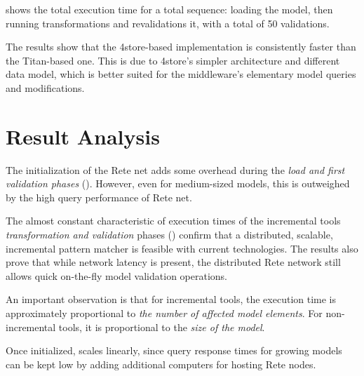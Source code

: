 



 shows the total execution time for a total sequence: loading the model, then running transformations and revalidations it, with a total of 50 validations. 

The results show that the 4store-based \iqd{} implementation is consistently faster than the Titan-based one. This is due to 4store's simpler architecture and different data model, which is better suited for the \iqd{} middleware's elementary model queries and modifications.

\section{Result Analysis}


The initialization of the Rete net adds some overhead during the \emph{load and first validation phases} (). However, even for medium-sized models, this is outweighed by the high query performance of Rete net.

The almost constant characteristic of execution times of the incremental tools \emph{transformation and validation} phases () confirm that a distributed, scalable, incremental pattern matcher is feasible with current technologies. The results also prove that while network latency is present, the distributed Rete network still allows quick on-the-fly model validation operations. 

An important observation is that for incremental tools, the execution time is approximately proportional to \emph{the number of affected model elements}. For non-incremental tools, it is proportional to the \emph{size of the model}. 

Once initialized, \iqd{} scales linearly, since query response times for growing models can be kept low by adding additional computers for hosting Rete nodes.

